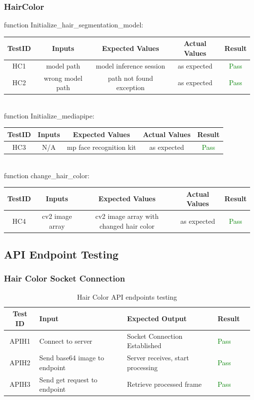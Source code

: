 \documentclass[12pt, oneside, openany, titlepage]{article}
\begin{document}
\subsubsection{HairColor}
function Initialize\_hair\_segmentation\_model:\\
\newline
\begin{tabular}{ |c|c|c|c|c| } 
 \hline
 TestID & Inputs & Expected Values & Actual Values & Result \\ 
 \hline
HC1 & model path & model inference session & as expected & \textcolor{green}{Pass} \\
HC2 & wrong model path & path not found exception & as expected & \textcolor{green}{Pass} \\
 \hline
\end{tabular}
\\
\newline
function Initialize\_mediapipe:\\
\newline
\begin{tabular}{ |c|c|c|c|c| } 
 \hline
 TestID & Inputs & Expected Values & Actual Values & Result \\ 
 \hline
HC3 & N/A & mp face recognition kit & as expected & \textcolor{green}{Pass} \\
 \hline
\end{tabular}
\\
\newline
function change\_hair\_color:\\
\newline
\begin{tabular}{ |c|c|c|c|c| } 
 \hline
 TestID & Inputs & Expected Values & Actual Values & Result \\ 
 \hline
HC4 & cv2 image array & cv2 image array with changed hair color & as expected & \textcolor{green}{Pass} \\
 \hline
\end{tabular}
\newpage
\subsection{API Endpoint Testing}
\subsubsection{Hair Color Socket Connection}
\begin{table}[ht!]
    \centering
    \begin{tabular}{|c|p{}|p{}|p{}|c|}
    \hline
        \textbf{Test ID} & \textbf{Input} & \textbf{Expected Output} & \textbf{Result} \\ \hline
        APIH1 & Connect to server & Socket Connection Established & \textcolor{green}{Pass} \\ \hline
        APIH2 & Send base64 image to endpoint & Server receives, start processing & \textcolor{green}{Pass} \\ \hline
        APIH3 & Send get request to endpoint & Retrieve processed frame & \textcolor{green}{Pass} \\ \hline
    \end{tabular}
    \caption{Hair Color API endpoints testing}
\end{table}
\end{document}
